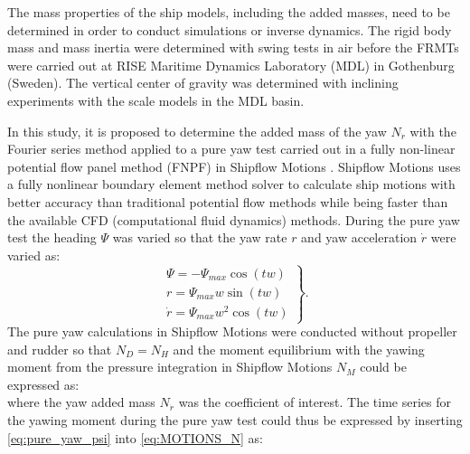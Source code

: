 \noindent The mass properties of the ship models, including the added masses, need to be determined in order to conduct simulations or inverse dynamics. The rigid body mass and mass inertia were determined with swing tests in air before the FRMTs were carried out at RISE Maritime Dynamics Laboratory (MDL) in Gothenburg (Sweden). The vertical center of gravity was determined with inclining experiments with the scale models in the MDL basin.

In this study, it is proposed to determine the added mass of the yaw $N_{\dot{r}}$ with the Fourier series method \citep{sakamotoURANSSimulationsStatic2012} applied to a pure yaw test carried out in a fully non-linear potential flow panel method (FNPF) in Shipflow Motions \citep{kjellbergFullyNonlinearUnsteady2013}.
Shipflow Motions uses a fully nonlinear boundary element method solver to calculate ship motions with better accuracy than traditional potential flow methods while being faster than the available CFD (computational fluid dynamics) methods.
During the pure yaw test the heading $\Psi$ was varied  so that the yaw rate $r$ and yaw acceleration $\dot{r}$ were varied as:
\begin{equation}
    \left.\begin{aligned}
    \Psi = - \Psi_{max} \cos{\left(t w \right)} \\
    r = \Psi_{max} w \sin{\left(t w \right)} \\
    \dot{r} = \Psi_{max} w^{2} \cos{\left(t w \right)}
    \end{aligned}\right\}.
    \label{eq:pure_yaw_psi}
\end{equation}
The pure yaw calculations in Shipflow Motions were conducted without propeller and rudder so that $N_D=N_H$ and the moment equilibrium with the yawing moment from the pressure integration in Shipflow Motions $N_M$ could be expressed as: 
\begin{equation}
    
    \label{eq:MOTIONS_N}
\end{equation}
where the yaw added mass $N_{\dot{r}}$ was the coefficient of interest. 
The time series for the yawing moment during the pure yaw test could thus be expressed by inserting \autoref{eq:pure_yaw_psi}  into \autoref{eq:MOTIONS_N} as:
